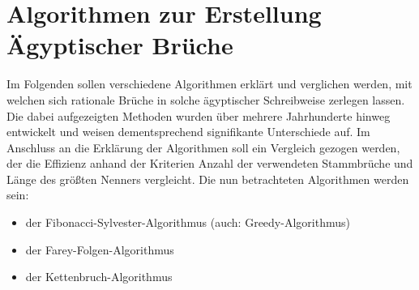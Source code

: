 \section{Algorithmen zur Erstellung Ägyptischer Brüche}
Im Folgenden sollen verschiedene Algorithmen erklärt und verglichen werden, mit welchen sich rationale Brüche in solche ägyptischer Schreibweise zerlegen lassen. Die dabei aufgezeigten Methoden wurden über mehrere Jahrhunderte hinweg entwickelt und weisen dementsprechend signifikante Unterschiede auf. Im Anschluss an die Erklärung der Algorithmen soll ein Vergleich gezogen werden, der die Effizienz anhand der Kriterien Anzahl der verwendeten Stammbrüche und Länge des größten Nenners vergleicht.
Die nun betrachteten Algorithmen werden sein:
\begin{itemize}
	\item der Fibonacci-Sylvester-Algorithmus (auch: Greedy-Algorithmus)
	\item der Farey-Folgen-Algorithmus
	\item der Kettenbruch-Algorithmus
\end{itemize}
